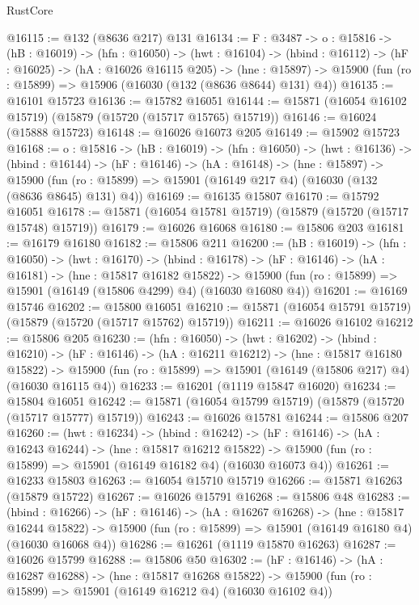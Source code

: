 \begin{lexlean}{RustCore}
\begin{coremodule}
@16115 := @132 (@8636 @217) @131
@16134 := {F : @3487} ->
  {o : @15816} ->
  (hB : @16019) ->
  (hfn : @16050) ->
  (hwt : @16104) ->
  (hbind : @16112) ->
  (hF : @16025) ->
  (hA : @16026 @16115 @205) ->
  (hne : @15897) -> @15900 (fun (ro : @15899) => @15906 (@16030 (@132 (@8636 @8644) @131) @4))
@16135 := @16101 @15723
@16136 := @15782 @16051
@16144 := @15871 (@16054 @16102 @15719) (@15879 (@15720 (@15717 @15765) @15719))
@16146 := @16024 (@15888 @15723)
@16148 := @16026 @16073 @205
@16149 := @15902 @15723
@16168 := {o : @15816} ->
  (hB : @16019) ->
  (hfn : @16050) ->
  (hwt : @16136) ->
  (hbind : @16144) ->
  (hF : @16146) ->
  (hA : @16148) ->
  (hne : @15897) ->
  @15900 (fun (ro : @15899) => @15901 (@16149 @217 @4) (@16030 (@132 (@8636 @8645) @131) @4))
@16169 := @16135 @15807
@16170 := @15792 @16051
@16178 := @15871 (@16054 @15781 @15719) (@15879 (@15720 (@15717 @15748) @15719))
@16179 := @16026 @16068
@16180 := @15806 @203
@16181 := @16179 @16180
@16182 := @15806 @211
@16200 := (hB : @16019) ->
  (hfn : @16050) ->
  (hwt : @16170) ->
  (hbind : @16178) ->
  (hF : @16146) ->
  (hA : @16181) ->
  (hne : @15817 @16182 @15822) ->
  @15900 (fun (ro : @15899) => @15901 (@16149 (@15806 @4299) @4) (@16030 @16080 @4))
@16201 := @16169 @15746
@16202 := @15800 @16051
@16210 := @15871 (@16054 @15791 @15719) (@15879 (@15720 (@15717 @15762) @15719))
@16211 := @16026 @16102
@16212 := @15806 @205
@16230 := (hfn : @16050) ->
  (hwt : @16202) ->
  (hbind : @16210) ->
  (hF : @16146) ->
  (hA : @16211 @16212) ->
  (hne : @15817 @16180 @15822) ->
  @15900 (fun (ro : @15899) => @15901 (@16149 (@15806 @217) @4) (@16030 @16115 @4))
@16233 := @16201 (@1119 @15847 @16020)
@16234 := @15804 @16051
@16242 := @15871 (@16054 @15799 @15719) (@15879 (@15720 (@15717 @15777) @15719))
@16243 := @16026 @15781
@16244 := @15806 @207
@16260 := (hwt : @16234) ->
  (hbind : @16242) ->
  (hF : @16146) ->
  (hA : @16243 @16244) ->
  (hne : @15817 @16212 @15822) ->
  @15900 (fun (ro : @15899) => @15901 (@16149 @16182 @4) (@16030 @16073 @4))
@16261 := @16233 @15803
@16263 := @16054 @15710 @15719
@16266 := @15871 @16263 (@15879 @15722)
@16267 := @16026 @15791
@16268 := @15806 @48
@16283 := (hbind : @16266) ->
  (hF : @16146) ->
  (hA : @16267 @16268) ->
  (hne : @15817 @16244 @15822) ->
  @15900 (fun (ro : @15899) => @15901 (@16149 @16180 @4) (@16030 @16068 @4))
@16286 := @16261 (@1119 @15870 @16263)
@16287 := @16026 @15799
@16288 := @15806 @50
@16302 := (hF : @16146) ->
  (hA : @16287 @16288) ->
  (hne : @15817 @16268 @15822) ->
  @15900 (fun (ro : @15899) => @15901 (@16149 @16212 @4) (@16030 @16102 @4))

\end{coremodule}
\end{lexlean}
